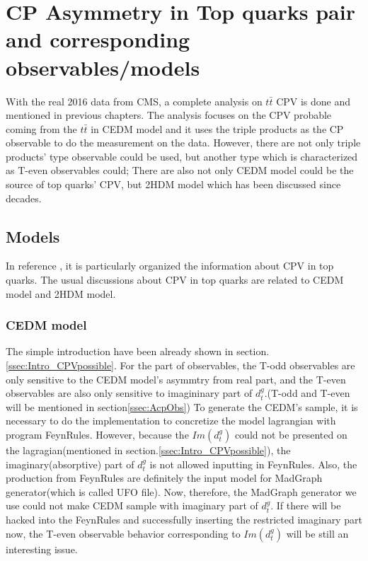 

\section{CP Asymmetry in Top quarks pair and corresponding observables/models}
\label{sec:AcpModelObs}

	With the real 2016 data from CMS, a complete analysis on $t\bar{t}$ CPV is done and mentioned in previous chapters. The analysis focuses on the CPV probable coming from the $t\bar{t}$ in CEDM model and it uses the triple products as the CP observable to do the measurement on the data. However, there are not only triple products' type observable could be used, but another type which is characterized as T-even observables could; There are also not only CEDM model could be the source of top quarks' CPV, but 2HDM model which has been discussed since decades. 

	\subsection{Models}
	\label{ssec:AcpModel}

		In reference \cite{Atwood:2000tu}, it is particularly organized the information about CPV in top quarks. The usual discussions about CPV in top quarks are related to CEDM model and 2HDM model.

		\subsubsection{ CEDM model}
		\label{sssec:AcpModel_CEDM}

			The simple introduction have been already shown in section.\ref{ssec:Intro_CPVpossible}. For the part of observables, the T-odd observables are only sensitive to the CEDM model's asymmtry from real part, and the T-even observables are also only sensitive to imagininary part of $d_t^g$.(T-odd and T-even will be mentioned in section\ref{ssec:AcpObs}) To generate the CEDM's sample, it is necessary to do the implementation to concretize the model lagrangian with program FeynRules\cite{Christensen:2008py}. However, because the $Im(d_t^g)$ could not be presented on the lagragian(mentioned in section.\ref{ssec:Intro_CPVpossible}), the imaginary(absorptive) part of $d_t^g$ is not allowed inputting in FeynRules. Also, the production from FeynRules are definitely the input model for MadGraph generator(which is called UFO file). Now, therefore, the MadGraph generator we use could not make CEDM sample with imaginary part of $d_t^g$. If there will be hacked into the FeynRules and successfully inserting the restricted imaginary part now, the T-even observable behavior corresponding to $Im(d_t^g)$ will be still an interesting issue.

